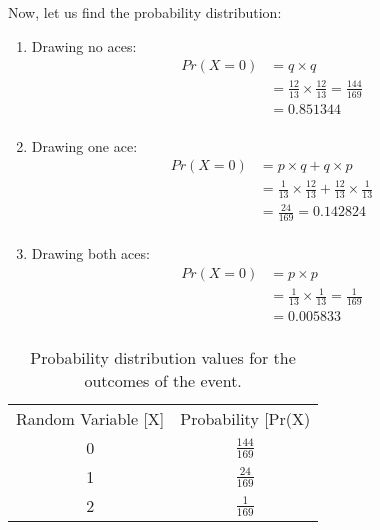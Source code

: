 \documentclass[journal,12pt,twocolumn]{IEEEtran}
\begin{document}
\section*{}
Now, let us find the probability distribution:
\begin{enumerate}
    \item Drawing no aces:
    \begin{align}
        Pr(X=0) &= q \times q\\
        &= \frac{12}{13}\times\frac{12}{13} = \frac{144}{169}\\
        &= 0.851344\\\nonumber
    \end{align}
    \item Drawing one ace:
    \begin{align}
        Pr(X=0) &= p \times q + q \times p\\
        &= \frac{1}{13}\times\frac{12}{13} + \frac{12}{13}\times\frac{1}{13}\nonumber\\
        &= \frac{24}{169} = 0.142824\\\nonumber
    \end{align}
    \item Drawing both aces:
    \begin{align}
        Pr(X=0) &= p \times p\\
        &= \frac{1}{13}\times\frac{1}{13} = \frac{1}{169}\\
        &= 0.005833\\\nonumber
    \end{align}
\end{enumerate}

\begin{table}[H]
    \centering
        \begin{tabular}{|c|c|}
            \hline
            \multirow{2}{*}{\normalsize{Random Variable [X]}} &   \multirow{2}{*}{\normalsize{Probability [Pr(X)}}    \\
                                        &                                                \\\hline
            \multirow{2}{*}{\large{0}}  &   \multirow{2}{*}{\large{\(\frac{144}{169}\)}} \\
                                        &                                                \\\hline
            \multirow{2}{*}{\large{1}}  &   \multirow{2}{*}{\large{\(\frac{24}{169}\)}}  \\
                                        &                                                \\\hline
            \multirow{2}{*}{\large{2}}  &   \multirow{2}{*}{\large{\(\frac{1}{169}\)}}   \\
                                        &                                                \\\hline
    \end{tabular}
    \caption{Probability distribution values for the outcomes of the event.}
    \label{Probabilty Distribution Table}
\end{table}
\end{document}
